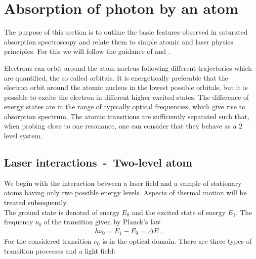 
\ifpdf{}
\graphicspath{{Chapter2/Figs/Raster/}{Chapter2/Figs/PDF/}{Chapter2/Figs/}}
\else
\graphicspath{{Chapter2/Figs/Vector/}{Chapter2/Figs/}}
\fi

\chapter{Absorption of photon by an atom}  %
The purpose of this section is to outline the basic features observed in 
saturated absorption spectroscopy and relate them to simple atomic and laser 
physics principles. For this we will follow the guidance of \citep{SAS} and 
\citep{SAS_appendix}.

Electrons can orbit around the atom nucleus following different trajectories which
are quantified, the so called orbitals. It is energetically preferable that the
electron orbit around the atomic nucleus in the lowest possible orbitals, but it 
is possible to excite the electron in different higher excited states. The 
difference of energy states are in the range of typically optical frequencies, 
which give rise to absorption spectrum. The atomic transitions are sufficiently 
separated such that, when probing close to one resonance, one can consider that 
they behave as a 2 level system.

\section{Laser interactions~-~Two-level atom} %

We begin with the interaction between a laser field and a sample of stationary 
atoms having only two possible energy levels. Aspects of thermal motion will 
be treated subsequently.\\ 
The ground state is denoted  of energy \(E_0 \) and the excited state 
 of energy \(E_1 \). The frequency \(\nu_0 \) of the transition given by 
Planck's law
\begin{align}
    h \nu_0 = E_1 - E_0=\Delta E~.
\end{align}
For the considered transition \(\nu_0 \) is in the optical domain.
There are three types of transition processes and a light field:


